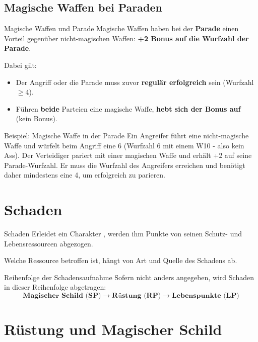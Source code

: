 \subsection*{Magische Waffen bei Paraden}

\begin{rulebox}{Magische Waffen und Parade}
	Magische Waffen haben bei der \textbf{Parade} einen Vorteil gegenüber nicht-magischen Waffen:
	\textbf{+2 Bonus auf die Wurfzahl der Parade}.
\end{rulebox}

Dabei gilt:
\begin{itemize}
	\item Der Angriff oder die Parade muss zuvor \textbf{regulär erfolgreich} sein (Wurfzahl $\ge 4$).
	\item Führen \textbf{beide} Parteien eine magische Waffe, \textbf{hebt sich der Bonus auf} (kein Bonus).
\end{itemize}

\begin{examplebox}{Beispiel: Magische Waffe in der Parade}
	Ein Angreifer führt eine nicht-magische Waffe und würfelt beim Angriff eine 6 (Wurfzahl 6 mit einem W10 - also kein Ass).
	Der Verteidiger pariert mit einer magischen Waffe und erhält +2 auf seine Parade-Wurfzahl.
	Er muss die Wurfzahl des Angreifers erreichen und benötigt daher mindestens eine 4,
	um erfolgreich zu parieren.
\end{examplebox}


\section{Schaden}

\begin{rulebox}{Schaden}
	Erleidet ein Charakter , werden ihm Punkte von seinen Schutz- und
	Lebensressourcen abgezogen.
\end{rulebox}

Welche Ressource betroffen ist, hängt von Art und Quelle des Schadens ab.
\begin{rulebox}{Reihenfolge der Schadensaufnahme}
	Sofern nicht anders angegeben, wird Schaden in dieser Reihenfolge abgetragen:
	\[
	\textbf{Magischer Schild (SP)} \rightarrow \textbf{Rüstung (RP)} \rightarrow \textbf{Lebenspunkte (LP)}
	\]
\end{rulebox}

\section{Rüstung und Magischer Schild}

